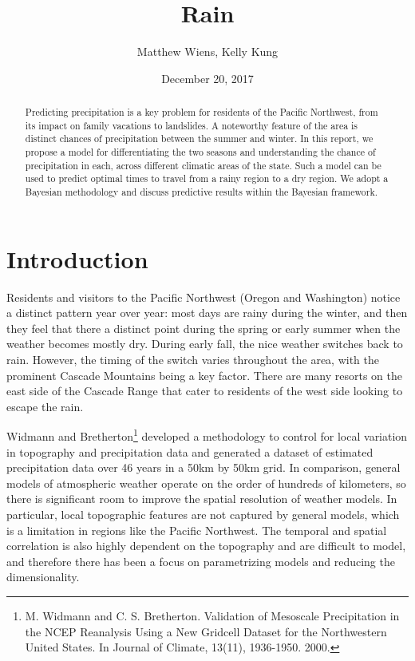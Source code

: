 \documentclass{article}
\begin{document}
\title{Rain}
\author{Matthew Wiens, Kelly Kung}
\date{December 20, 2017}
\maketitle
\begin{abstract}

Predicting precipitation is a key problem for residents of the Pacific Northwest, from its impact on family vacations to landslides. A noteworthy feature of the area is distinct chances of precipitation between the summer and winter. In this report, we propose a model for differentiating the two seasons and understanding the chance of precipitation in each, across different climatic areas of the state. Such a model can be used to predict optimal times to travel from a rainy region to a dry region. We adopt a Bayesian methodology and  discuss predictive results within the Bayesian framework.  

\end{abstract}

\section{Introduction}

Residents and visitors to the Pacific Northwest (Oregon and Washington) notice a distinct pattern year over year: most days are rainy during the winter, and then they feel that there a distinct point during the spring or early summer when the weather becomes mostly dry. During early fall, the nice weather switches back to rain.  However, the timing of the switch varies throughout the area, with the prominent Cascade Mountains being a key factor. There are many resorts on the east side of the Cascade Range that cater to residents of the west side looking to escape the rain. 

Widmann and Bretherton\footnote{M. Widmann and C. S. Bretherton. Validation of Mesoscale Precipitation in the NCEP Reanalysis Using a New Gridcell Dataset for the Northwestern United States. In Journal of Climate, 13(11), 1936-1950. 2000.} developed a methodology to control for local variation in topography and precipitation data and generated a dataset of estimated precipitation data over 46 years in a 50km by 50km grid.  In comparison, general models of atmospheric weather operate on the order of hundreds of kilometers, so there is significant room to improve the spatial resolution of weather models.  In particular, local topographic features are not captured by general models, which is a limitation in regions like the Pacific Northwest. The temporal and spatial correlation is also highly dependent on the topography and are difficult to model, and therefore there has been a focus on parametrizing models and reducing the dimensionality. 
\end{document}
